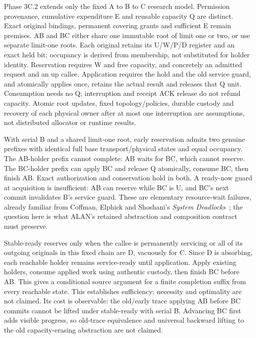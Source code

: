 \documentclass[11pt,a4paper]{article}
\theoremstyle{definition}
\theoremstyle{remark}
\begin{document}
Phase 3C.2 extends only the fixed A to B to C research model. Permission provenance, cumulative expenditure E and reusable capacity Q are distinct. Exact original bindings, permanent covering grants and sufficient E remain premises. AB and BC either share one immutable root of limit one or two, or use separate limit-one roots. Each original retains its U/W/P/D register and an exact held bit; occupancy is derived from membership, not substituted for holder identity. Reservation requires W and free capacity, and concretely an admitted request and an up callee. Application requires the hold and the old service guard, and atomically applies once, retains the actual result and releases that Q unit. Consumption needs no Q; interruption and receipt ACK release do not refund capacity. Atomic root updates, fixed topology/policies, durable custody and recovery of each physical owner after at most one interruption are assumptions, not distributed allocator or runtime results.

With serial B and a shared limit-one root, early reservation admits two genuine prefixes with identical full base transport/physical states and equal occupancy. The AB-holder prefix cannot complete: AB waits for BC, which cannot reserve. The BC-holder prefix can apply BC and release Q atomically, consume BC, then finish AB. Exact authorization and conservation hold in both. A ready-now guard at acquisition is insufficient: AB can reserve while BC is U, and BC's next commit invalidates B's service guard. These are elementary resource-wait failures, already familiar from Coffman, Elphick and Shoshani's \emph{System Deadlocks}~\cite{coffman1971deadlocks}; the question here is what ALAN's retained abstraction and composition contract must preserve.

Stable-ready reserves only when the callee is permanently servicing or all of its outgoing originals in this fixed chain are D, vacuously for C. Since D is absorbing, each reachable holder remains service-ready until application. Apply existing holders, consume applied work using authentic custody, then finish BC before AB. This gives a conditional source argument for a finite completion suffix from every reachable state. This establishes sufficiency; necessity and optimality are not claimed. Its cost is observable: the old/early trace applying AB before BC commits cannot be lifted under stable-ready with serial B. Advancing BC first adds visible progress, so old-trace equivalence and universal backward lifting to the old capacity-erasing abstraction are not claimed.
\end{document}
